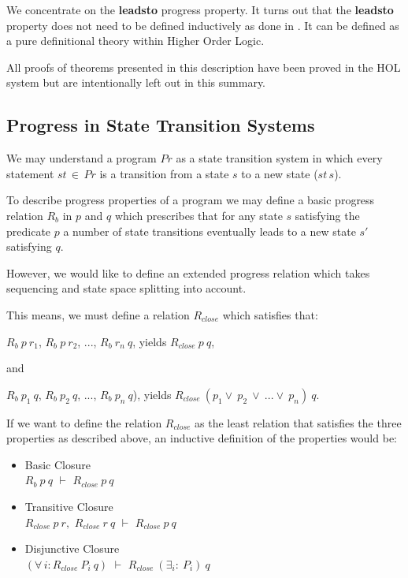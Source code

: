 \bigskip
We concentrate on the {\bf leadsto} progress property. It turns out that the
{\bf leadsto} property does not need to be defined inductively as done in
\cite{CM88}. It can be defined as a pure definitional theory within Higher
Order Logic.

\bigskip
All proofs of theorems presented in this description have been proved in the
HOL system but are intentionally left out in this summary.


\subsection*{Progress in State Transition Systems}

We may understand a program $Pr$ as a state transition system in  which every
statement $st\, \in\, Pr$ is a transition from a state $s$ to a new state
($st\, s$).

\bigskip
To describe progress properties of a program we may define a basic progress
relation $R_b$ in $p$ and $q$ which prescribes that for any state $s$
satisfying the predicate $p$ a number of state transitions eventually leads to
a new state $s'$ satisfying $q$.

\bigskip
However, we would like to define an extended progress relation which takes
sequencing and state space splitting into account.

\bigskip
This means, we must define a relation $R_{close}$ which satisfies that:

\bigskip
\cnd $R_b\ p\ r_1$, $R_b\ p\ r_2$, ..., $R_b\ r_n\ q$,
yields $R_{close}\ p\ q$,

\bigskip
and
 
\bigskip
\cnd $R_b\ p_1\ q$, $R_b\ p_2\ q$, ..., $R_b\ p_n\ q$),
yields $R_{close}\ (p_1 \vee\ p_2\ \vee\ ... \vee\ p_n)\ q$.
 
\bigskip
If we want to define the relation $R_{close}$ as the least relation that
satisfies the three properties as described above, an inductive definition of
the properties would be:

\bigskip
\begin{itemize}
   \item Basic Closure\\
       \cnd \mbox{$R_b\ p\ q$} $\vdash$ \mbox{$R_{close}\ p\ q$}
   \item Transitive Closure\\
       \cnd \mbox{$R_{close}\ p\ r,$} \mbox{$R_{close}\ r\ q$} $\vdash$
        \mbox{$R_{close}\ p\ q$}
   \item Disjunctive Closure\\
       \cnd \mbox{$(\forall\,i: R_{close}\ P_i\ q)$} $\vdash$
                \mbox{$R_{close}\ (\exists_i:\ P_i)\ q$}
\end{itemize}

